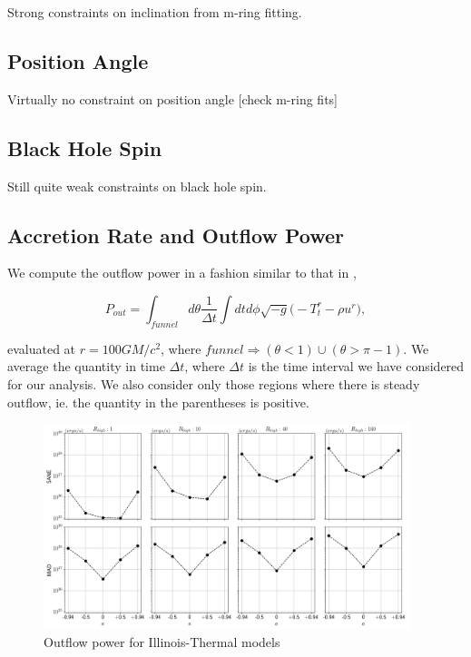 
Strong constraints on inclination from m-ring fitting.

\subsection{Position Angle}

Virtually no constraint on position angle [check m-ring fits]

\subsection{Black Hole Spin}

Still quite weak constraints on black hole spin.

\subsection{Accretion Rate and Outflow Power}


We compute the outflow power in a fashion similar to that in \citet{M87PaperV},

\begin{equation}
    P_{out} = \int_{funnel}d\theta\frac{1}{\Delta t}\int dtd\phi\sqrt{-g}\big(-T^{r}_{t}-\rho u^{r}\big),
\end{equation}

evaluated at $r=100GM/c^{2}$, where $funnel\Rightarrow(\theta<1)\cup(\theta>\pi-1)$. We average the quantity in time $\Delta t$, where $\Delta t$ is the time interval we have considered for our analysis. We also consider only those regions where there is steady outflow, ie. the quantity in the parentheses is positive.

\begin{figure}
\centering
\includegraphics[width=0.95\textwidth]{figures/illinoisv3_total_output_power.png}
\caption{Outflow power for Illinois-Thermal models}
\label{fig:outflow_illinois_thermal}
\end{figure}

